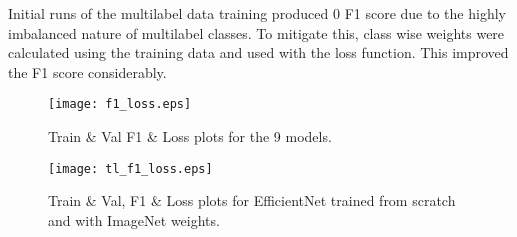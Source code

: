 \documentclass[10pt,twocolumn,letterpaper]{article}
\begin{document}
Initial runs of the multilabel data training produced 0 F1 score due to the highly imbalanced 
nature of multilabel classes. To mitigate this, class wise weights were calculated using the training 
data and used with the loss function. This improved the F1 score considerably. 
\begin{table*}[tbh]
  \centering
  \boldmath
  \caption{F1 (higher is better), time per epoch in seconds (lower is better), and number of epochs to reach the best validation loss (lower is better) for the 12 models that were trained.}
  \label{table:test_metrics}
  \end{table*}
  
  \begin{figure}[t]
    \centering
    \texttt{[image: f1\_loss.eps]}  
     \caption{Train \& Val F1 \& Loss plots for the 9 models.}
     \label{fig:acc_loss_sep}
  \end{figure}
  
  \begin{figure}[t]
    \centering
    \texttt{[image: tl\_f1\_loss.eps]}  
     \caption{Train \& Val, F1 \& Loss plots for EfficientNet trained from scratch and with ImageNet weights.}
     \label{fig:tl_acc_loss}
  \end{figure}
\end{document}
